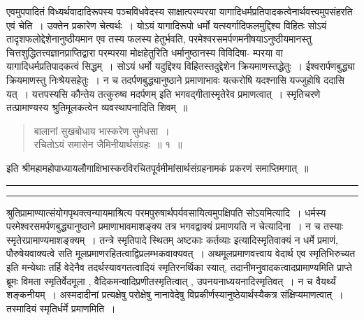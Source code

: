 \documentclass[11pt, openany]{book}
\begin{document}
 एवमुपपादितं विध्यर्थवादादिरूपस्य पञ्चविधवेदस्य साक्षात्परम्परया यागादिधर्मप्रतिपादकत्वेनार्थवत्त्वमुपसंहरति {\br एवं चेति~।} उक्तेन प्रकारेण चेत्यर्थः~। योऽयं यागादिरूपो धर्मो यत्स्वर्गादिफलमुद्दिश्य विहितः सोऽयं तादृशफलोद्देशेनानुष्ठीयमान एव तस्य फलस्य हेतुर्भवति, परमेश्वरसमर्पणमनीषयाऽनुष्ठीयमानस्तु  चित्तशुद्धितत्त्वज्ञानप्राप्तिद्वारा परम्परया मोक्षहेतुरिति धर्मानुष्ठानस्य विविदिषा-
\newpage
\fancyhead[RE]{[ ग्रन्थोप\textemdash\ }
{\bl\noindent 
म्परया वा यागादिधर्मप्रतिपादकत्वं सिद्धम्~। सोऽयं धर्मो  यदुद्दिश्य विहितस्तदुद्देशेन क्रियमाणस्तद्धेतुः~। ईश्वरार्पणबुद्ध्या  क्रियमाणस्तु निःश्रेयसहेतुः~। न च तदर्पणबुद्ध्यानुष्ठाने प्रमाणाभावः {\qt यत्करोषि यदश्नासि यज्जुहोषि ददासि यत्~। यत्तपस्यसि कौन्तेय तत्कुरुष्व मदर्पणम्}  इति भगवद्गीतास्मृतेरेव प्रमाणत्वात्~। स्मृतिचरणे तत्प्रामाण्यस्य श्रुतिमूलकत्वेन व्यवस्थापनादिति शिवम्~॥}
\begin{quote}
    \al  बालानां सुखबोधाय भास्करेण सुमेधसा~।\\
 रचितोऽयं समासेन जैमिनीयार्थसंग्रहः~॥ १~॥  
\end{quote}
 \begin{center}
     \bl
इति श्रीमहामहोपाध्यायलौगाक्षिभास्करविरचितपूर्वमीमांसार्थसंग्रहनामकं प्रकरणं समाप्तिमगात्~॥\\
\rule{.15\linewidth}{.5pt}
 \end{center}
\hrule
\vspace{3mm}
\noindent
श्रुतिप्रामाण्यात्संयोगपृथक्त्वन्यायमाश्रित्य परमपुरुषार्थपर्यवसायित्वमुपक्षिपति {\br सोऽयमित्यादि~।} धर्मस्य परमेश्वरसमर्पणबुद्ध्यानुष्ठाने प्रमाणाभावमाशङ्क्य तत्र भगवद्वाक्यं प्रमाणयति {\br न चेत्यादिना~।} न च तस्याः स्मृतेरप्रामाण्यमाशङ्क्यम्~। तन्त्रे स्मृतिपादे स्थितम् {\qt अष्टकाः कर्तव्याः} इत्यादिस्मृतिवाक्यं न धर्मे प्रमाणं, पौरुषेयवाक्यत्वे सति मूलप्रमाणरहितत्वाद्विप्रलम्भकवाक्यवत्~।
\noindent अथ\textendash  मूलप्रमाणवत्त्वाय वेदार्थ एव स्मृतिभिरुच्यत इति मन्येथाः तर्हि वेदेनैव तदर्थस्यावगतत्वादियं स्मृतिरनर्थिका स्यात्, तदानीमनुवादकत्वादप्रामाण्यमिति प्राप्ते ब्रूमः {\qt विमता स्मृतिर्वेदमूला , वैदिकमन्वादिप्रणीतस्मृतित्वात् , उपनयनाध्ययनादिस्मृतिवत्~}। न च वैयर्थ्यं शङ्कनीयम्~। अस्मदादीनां प्रत्यक्षेषु परोक्षेषु  नानावेदेषु विप्रकीर्णस्यानुष्ठेयार्थस्यैकत्र संक्षिप्यमाणत्वात्~। तस्मादियं स्मृतिर्धर्मे प्रमाणमिति~।~\\
\end{document}

